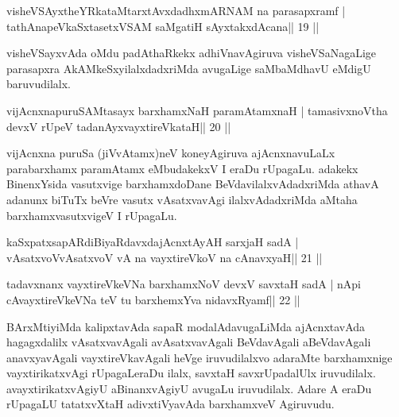 

\begin{shl}
visheVSAyxtheYRkataMtarxtAvxdadhxmARNAM na parasapxramf |
tathA\s napeVkaSxtasetxVSAM saMgatiH sAyxtakxdAcana\hfill || 19 ||
\end{shl}

\begin{artha}
visheVSayxvAda oMdu padAthaRkekx adhiVnavAgiruva visheVSaNagaLige parasapxra AkAMkeSxyilalxdadxriMda avugaLige saMbaMdhavU eMdigU baruvudilalx.
\end{artha}

\begin{shl}
vijAcnxnapuruSAMtasayx barxhamxNaH paramAtamxnaH |
tamasivxnoV\s tha devxV rUpeV tadanAyxvayxtireVkataH\hfill || 20 ||
\end{shl}

\begin{artha}
vijAcnxna puruSa (jiVvAtamx)neV koneyAgiruva ajAcnxnavuLaLx parabarxhamx paramAtamx eMbudakekxV I eraDu rUpagaLu. adakekx BinenxYsida vasutxvige barxhamxdoDane BeVdavilalxvAdadxriMda athavA adanunx biTuTx beVre vasutx vAsatxvavAgi ilalxvAdadxriMda aMtaha barxhamxvasutxvigeV I rUpagaLu.
\end{artha}



\begin{shl}
kaSxpatxsapARdiBiyaRdavxdajAcnxtAyAH sarxjaH sadA |
vAsatxvoV\s vAsatxvoV vA na vayxtireVkoV na cAnavxyaH\hfill || 21 ||
\end{shl}

\begin{shl}
tadavxnanx vayxtireVkeVNa barxhamxNoV devxV savxtaH sadA |
nApi cAvayxtireVkeVNa teV tu barxhemxYva nidavxRyamf\hfill || 22 ||
\end{shl}

\begin{artha}
BArxMtiyiMda kalipxtavAda sapaR modalAdavugaLiMda ajAcnxtavAda
hagagxdalilx vAsatxvavAgali avAsatxvavAgali BeVdavAgali aBeVdavAgali
anavxyavAgali vayxtireVkavAgali heVge iruvudilalxvo adaraMte
barxhamxnige vayxtirikatxvAgi rUpagaLeraDu ilalx, savxtaH savxrUpadalUlx
iruvudilalx. avayxtirikatxvAgiyU aBinanxvAgiyU avugaLu iruvudilalx.
Adare A eraDu rUpagaLU tatatxvXtaH adivxtiVyavAda barxhamxveV Agiruvudu.
\end{artha}



